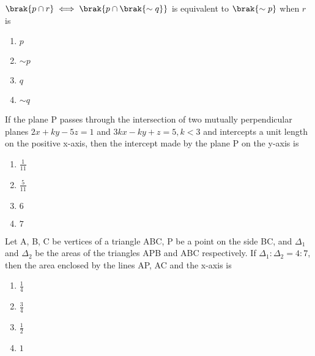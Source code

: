 \iffalse
	\title{2022}
	\author{AI24BTECH11003}
	\section{mcq-single}
\fi

    \item $\brak{p\cap r}\iff \brak{p\cap\brak{\sim q}}$ is equivalent to $\brak{\sim p}$ when $r$ is

        \begin{multicols}{4}
            \begin{enumerate}
                \item $p$
                \item $\sim p$
                \item $q$
                \item $\sim q$
            \end{enumerate}
        \end{multicols}

    \item If the plane P passes through the intersection of two mutually perpendicular planes $2x+ky-5z=1$ and $3kx-ky+z=5,k<3$ and intercepts a unit length on the positive x-axis, then the intercept made by the plane P on the y-axis is 

		\begin{multicols}{4}
			\begin{enumerate}
				\item $\frac{1}{11}$
				\item $\frac{5}{11}$
				\item $6$
				\item $7$
			\end{enumerate}
		\end{multicols}

    \item Let A, B, C be vertices of a triangle ABC, P be a point on the side BC, and $\Delta_1$ and $\Delta_2$ be the areas of the triangles APB and ABC respectively. If $\Delta_1:\Delta_2=4:7$, then the area enclosed by the lines AP, AC and the x-axis is

        \begin{multicols}{4}
            \begin{enumerate}
                \item $\frac{1}{4}$
                \item $\frac{3}{4}$
                \item $\frac{1}{2}$
                \item $1$
            \end{enumerate}
        \end{multicols}

